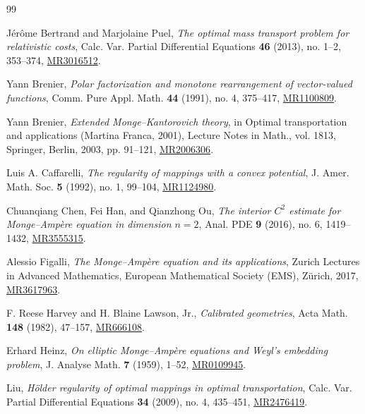 \documentclass[12pt,letterpaper]{amsart}
\theoremstyle{definition}
\theoremstyle{plain}
\numberwithin{equation}{section}
\begin{document}
\begin{thebibliography}{99}

J\'er\^ome Bertrand and Marjolaine Puel, \emph{The optimal mass transport
problem for relativistic costs}, Calc. Var. Partial Differential Equations
\textbf{46} (2013), no. 1--2, 353--374,
\href{https://mathscinet.ams.org/mathscinet-getitem?mr=3016512}{MR3016512}.

Yann Brenier, \emph{Polar factorization and monotone rearrangement of
vector-valued functions}, Comm. Pure Appl. Math. \textbf{44} (1991), no. 4,
375--417,
\href{https://mathscinet.ams.org/mathscinet-getitem?mr=1100809}{MR1100809}.

Yann Brenier, \emph{Extended Monge--Kantorovich theory}, in Optimal
transportation and applications (Martina Franca, 2001), Lecture Notes in
Math., vol. 1813, Springer, Berlin, 2003, pp. 91--121,
\href{https://mathscinet.ams.org/mathscinet-getitem?mr=2006306}{MR2006306}.

Luis A. Caffarelli, \emph{The regularity of mappings with a convex
potential}, J. Amer. Math. Soc. \textbf{5} (1992), no. 1, 99--104,
\href{https://mathscinet.ams.org/mathscinet-getitem?mr=1124980}{MR1124980}.

Chuanqiang Chen, Fei Han, and Qianzhong Ou, \emph{The interior $C^2$
estimate for Monge--Amp\`ere equation in dimension $n=2$}, Anal. PDE
\textbf{9} (2016), no. 6, 1419--1432,
\href{https://mathscinet.ams.org/mathscinet/article?mr=3555315}{MR3555315}.

Alessio Figalli, \emph{The Monge--Amp\`ere equation and its applications},
Zurich Lectures in Advanced Mathematics, European Mathematical Society
(EMS), Z\"urich, 2017,
\href{https://mathscinet.ams.org/mathscinet-getitem?mr=3617963}{MR3617963}.

F. Reese Harvey and H. Blaine Lawson, Jr., \emph{Calibrated geometries},
Acta Math. \textbf{148} (1982), 47--157,
\href{https://mathscinet.ams.org/mathscinet-getitem?mr=666108}{MR666108}.

Erhard Heinz, \emph{On elliptic Monge--Amp\`ere equations and Weyl's
embedding problem}, J. Analyse Math. \textbf{7} (1959), 1--52,
\href{https://mathscinet.ams.org/mathscinet-getitem?mr=109945}{MR0109945}.

Liu, \emph{H\"older regularity of optimal mappings in optimal
transportation}, Calc. Var. Partial Differential Equations \textbf{34}
(2009), no. 4, 435--451,
\href{https://mathscinet.ams.org/mathscinet-getitem?mr=2476419}{MR2476419}.


\end{thebibliography}
\end{document}
